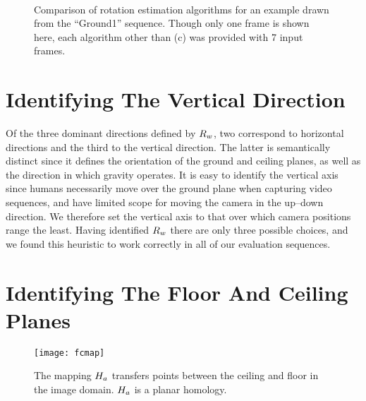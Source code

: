 \begin{figure}[p]
  \centering
  \quad
  \\
  \quad
  \caption{Comparison of rotation estimation algorithms for an example
    drawn from the ``Ground1'' sequence. Though only one frame is
    shown here, each algorithm other than (c) was provided with 7
    input frames.}
  \label{fig:vpt-example3}
\end{figure}

\section{Identifying The Vertical Direction}
Of the three dominant directions defined by $\SceneR$, two correspond to
horizontal directions and the third to the vertical direction. The
latter is semantically distinct since it defines the orientation of
the ground and ceiling planes, as well as the direction in which
gravity operates. It is easy to identify the vertical axis since
humans necessarily move over the ground plane when capturing video
sequences, and have limited scope for moving the camera in the
up--down direction. We therefore set the vertical axis to that over
which camera positions range the least. Having identified $\SceneR$ there
are only three possible choices, and we found this heuristic to work
correctly in all of our evaluation sequences.

\section{Identifying The Floor And Ceiling Planes}
\label{sect:fcmap}

\begin{figure}[tb]
  \centering
  \texttt{[image: fcmap]}
  \caption{The mapping $\Hcf$ transfers points between the ceiling and
    floor in the image domain. $\Hcf$ is a planar homology.}
  \label{fig:fcmap}
\end{figure}

